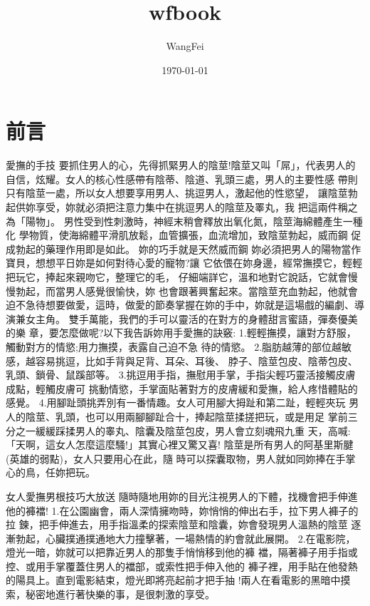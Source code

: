 \documentclass[12pt,UTF8]{ctexbook}
\title{\heiti\zihao{0} wfbook}
\author{WangFei}
\date{\today}
\begin{document}
\maketitle
\tableofcontents

\frontmatter

\chapter{前言}

愛撫的手技
要抓住男人的心，先得抓緊男人的陰莖!陰莖又叫「屌」，代表男人的
自信，炫耀。女人的核心性感帶有陰蒂、陰道、乳頭三處，男人的主要性感
帶則只有陰莖一處，所以女人想要享用男人、挑逗男人，激起他的性慾望，
讓陰莖勃起供妳享受，妳就必須把注意力集中在挑逗男人的陰莖及睪丸，我
把這兩件稱之為「陽物」。
男性受到性刺激時，神經末稍會釋放出氧化氮，陰莖海綿體產生一種化
學物質，使海綿體平滑肌放鬆，血管擴張，血流增加，致陰莖勃起，威而鋼
促成勃起的藥理作用即是如此。
妳的巧手就是天然威而鋼
妳必須把男人的陽物當作寶貝，想想平日妳是如何對待心愛的寵物?讓
它依偎在妳身邊，經常撫摸它，輕輕把玩它，捧起來親吻它，整理它的毛，
仔細端詳它，溫和地對它說話，它就會慢慢勃起，而當男人感覺很愉快，妳
也會跟著興奮起來。當陰莖充血勃起，他就會迫不急待想要做愛，這時，做愛的節奏掌握在妳的手中，妳就是這場戲的編劇、導演兼女主角。
雙手萬能，我們的手可以靈活的在對方的身體甜言蜜語，彈奏優美的樂
章，要怎麼做呢?以下我告訴妳用手愛撫的訣竅:
1.輕輕撫摸，讓對方舒服，觸動對方的情慾;用力撫摸，表露自己迫不急
待的情慾。
2.脂肪越薄的部位越敏感，越容易挑逗，比如手背與足背、耳朵、耳後、
脖子、陰莖包皮、陰蒂包皮、乳頭、鎖骨、鼠蹊部等。
3.挑逗用手指，撫慰用手掌，手指尖輕巧靈活接觸皮膚成點，輕觸皮膚可
挑動情慾，手掌面貼著對方的皮膚緩和愛撫，給人疼惜體貼的感覺。
4.用腳趾頭挑弄別有一番情趣。女人可用腳大拇趾和第二趾，輕輕夾玩
男人的陰莖、乳頭，也可以用兩腳腳趾合十，捧起陰莖揉搓把玩，或是用足
掌前三分之一緩緩踩揉男人的睾丸、陰囊及陰莖包皮，男人會立刻魂飛九重
天，高喊:「天啊，這女人怎麼這麼騷!」其實心裡又驚又喜!
陰莖是所有男人的阿基里斯腱(英雄的弱點)，女人只要用心在此，隨
時可以探囊取物，男人就如同妳捧在手掌心的鳥，任妳把玩。

女人愛撫男根技巧大放送
隨時隨地用妳的目光注視男人的下體，找機會把手伸進他的褲襠!
1.在公園幽會，兩人深情擁吻時，妳悄悄的伸出右手，拉下男人褲子的拉
鍊，把手伸進去，用手指溫柔的探索陰莖和陰囊，妳會發現男人溫熱的陰莖
逐漸勃起，心臟撲通撲通地大力撞擊著，一場熱情的約會就此展開。
2.在電影院，燈光一暗，妳就可以把靠近男人的那隻手悄悄移到他的褲
襠，隔著褲子用手指或控、或用手掌覆蓋住男人的襠部，或索性把手伸入他的
褲子裡，用手貼在他發熱的陽具上。直到電影結束，燈光即將亮起前才把手抽
!兩人在看電影的黑暗中摸索，秘密地進行著快樂的事，是很刺激的享受。
\end{document}
